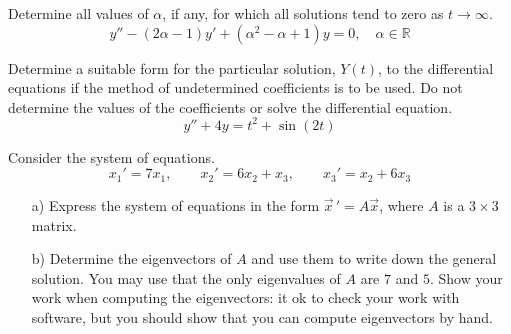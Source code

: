 \documentclass[12pt]{exam}
\begin{document}
    


\newpage

\InitialsRight

\begin{questions}

    \question[4] Determine all values of $\alpha$, if any, for which all solutions tend to zero as $t\to\infty$. $$y'' - (2\alpha - 1) y' + (\alpha^2-\alpha+1) y = 0, \quad \alpha \in \mathbb R$$ \vspace{10cm}  %
    
    \question[3]  Determine a suitable form for the particular solution, $Y(t)$, to the differential equations if the method of undetermined coefficients is to be used. Do not determine the values of the coefficients or solve the differential equation.
        $$y'' + 4y = t^2 + \sin(2t)$$
    
    \newpage    \InitialsLeft
    
        \question[10] Consider the system of equations. 
        $$
        x_1 ' = 7x_1 , \qquad x_2 ' = 6x_2 + x_3 , \qquad x_3 ' = x_2 + 6x_3 
        $$
        \begin{enumerate} 
            \item[a)] Express the system of equations in the form $\vec x \, ' = A \vec x$, where $A$ is a $3\times3$ matrix. \vspace{3cm} 

            \item[b)] Determine the eigenvectors of $A$ and use them to write down the general solution. You may use that the only eigenvalues of $A$ are $7$ and $5$. Show your work when computing the eigenvectors: it ok to check your work with software, but you should show that you can compute eigenvectors by hand. 
                
        \end{enumerate}
        
    \newpage \InitialsRight
    \Scratch 

    \newpage \InitialsLeft
    

\end{questions}
\end{document}
